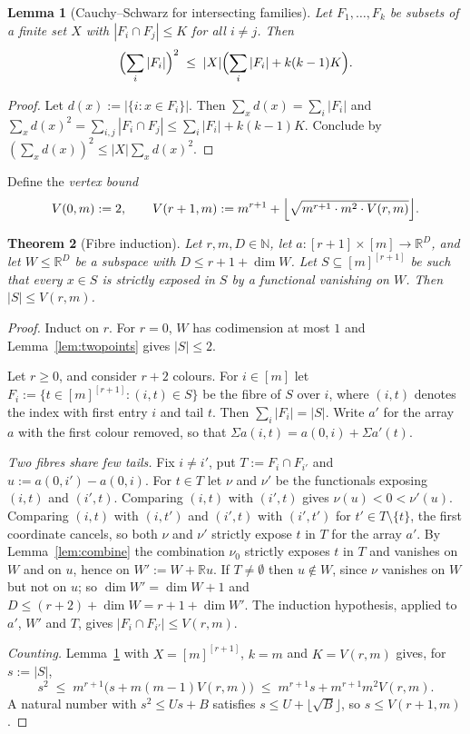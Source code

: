 \documentclass[11pt,a4paper]{article}
\theoremstyle{plain}
\newtheorem{theorem}{Theorem}[section]
\newtheorem{lemma}[theorem]{Lemma}
\theoremstyle{definition}
\newcommand{\R}{\mathbb{R}}
\newcommand{\N}{\mathbb{N}}
\begin{document}
\begin{lemma}[Cauchy--Schwarz for intersecting families]\label{lem:cs}
Let $F_1,\dots,F_k$ be subsets of a finite set $X$ with $|F_i\cap F_j|\le K$ for all $i\ne j$.
Then
\[
  \Bigl(\sum_i|F_i|\Bigr)^{2}\;\le\;|X|\Bigl(\sum_i|F_i|+k(k-1)K\Bigr).
\]
\end{lemma}

\begin{proof}
Let $d(x):=|\{i:x\in F_i\}|$. Then $\sum_xd(x)=\sum_i|F_i|$ and
$\sum_xd(x)^2=\sum_{i,j}|F_i\cap F_j|\le\sum_i|F_i|+k(k-1)K$. Conclude by
$(\sum_xd(x))^2\le|X|\sum_xd(x)^2$.
\end{proof}

Define the \emph{vertex bound}
\[
  V(0,m):=2,\qquad
  V(r+1,m):=m^{r+1}+\Bigl\lfloor\sqrt{m^{r+1}\cdot m^{2}\cdot V(r,m)}\Bigr\rfloor .
\]

\begin{theorem}[Fibre induction]\label{thm:fibre}
Let $r,m,D\in\N$, let $a\colon[r+1]\times[m]\to\R^D$, and let $W\le\R^D$ be a subspace with
$D\le r+1+\dim W$. Let $S\subseteq[m]^{[r+1]}$ be such that every $x\in S$ is strictly exposed
in $S$ by a functional vanishing on $W$. Then $|S|\le V(r,m)$.
\end{theorem}

\begin{proof}
Induct on $r$. For $r=0$, $W$ has codimension at most $1$ and Lemma~\ref{lem:twopoints} gives
$|S|\le2$.

Let $r\ge0$, and consider $r+2$ colours. For $i\in[m]$ let
$F_i:=\{t\in[m]^{[r+1]}:(i,t)\in S\}$ be the fibre of $S$ over $i$, where $(i,t)$ denotes the index
with first entry $i$ and tail $t$. Then $\sum_i|F_i|=|S|$. Write $a'$ for the array $a$ with the
first colour removed, so that $\Sigma a(i,t)=a(0,i)+\Sigma a'(t)$.

\smallskip\noindent\emph{Two fibres share few tails.} Fix $i\ne i'$, put $T:=F_i\cap F_{i'}$ and
$u:=a(0,i')-a(0,i)$. For $t\in T$ let $\nu$ and $\nu'$ be the functionals exposing $(i,t)$ and
$(i',t)$. Comparing $(i,t)$ with $(i',t)$ gives $\nu(u)<0<\nu'(u)$. Comparing $(i,t)$ with
$(i,t')$ and $(i',t)$ with $(i',t')$ for $t'\in T\setminus\{t\}$, the first coordinate cancels,
so both $\nu$ and $\nu'$ strictly expose $t$ in $T$ for the array $a'$. By Lemma~\ref{lem:combine}
the combination $\nu_0$ strictly exposes $t$ in $T$ and vanishes on $W$ and on $u$, hence on
$W':=W+\R u$. If $T\ne\emptyset$ then $u\notin W$, since $\nu$ vanishes on $W$ but not on $u$;
so $\dim W'=\dim W+1$ and $D\le(r+2)+\dim W=r+1+\dim W'$. The induction hypothesis, applied to
$a'$, $W'$ and $T$, gives $|F_i\cap F_{i'}|\le V(r,m)$.

\smallskip\noindent\emph{Counting.} Lemma~\ref{lem:cs} with $X=[m]^{[r+1]}$, $k=m$ and
$K=V(r,m)$ gives, for $s:=|S|$,
\[
  s^{2}\;\le\;m^{r+1}\bigl(s+m(m-1)V(r,m)\bigr)\;\le\;m^{r+1}s+m^{r+1}m^{2}V(r,m).
\]
A natural number with $s^2\le Us+B$ satisfies $s\le U+\lfloor\sqrt B\rfloor$, so
$s\le V(r+1,m)$.
\end{proof}
\end{document}
